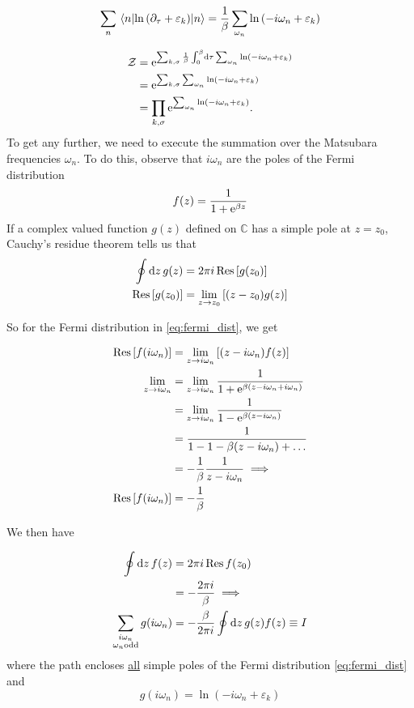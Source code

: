 \begin{equation}
\sum_n\ev{\ln\left(\partial_\tau + \varepsilon_k\right)}{n} = \frac{1}{\beta}\sum_{\omega_n}\ln\left(-i\omega_n + \varepsilon_k\right)
\end{equation}

\begin{align}
\mathcal{Z} &= \mathrm{e}^{\sum_{k,\sigma}\frac{1}{\beta}\int_0^\beta\dd{\tau}\sum_{\omega_n}\ln\left(-i\omega_n + \varepsilon_k\right)} \\
&= \mathrm{e}^{\sum_{k,\sigma}\sum_{\omega_n}\ln\left(-i\omega_n + \varepsilon_k\right)} \\
&= \prod_{k,\sigma}\mathrm{e}^{\sum_{\omega_n}\ln\left(-i\omega_n + \varepsilon_k\right)}.
\end{align}
To get any further, we need to execute the summation over the Matsubara frequencies $\omega_n$. To do this, observe that $i\omega_n$ are the poles of the Fermi distribution
\begin{equation}
\label{eq:fermi_dist}
f(z) = \frac{1}{1+\mathrm{e}^{\beta z}}
\end{equation}
If a complex valued function $g(z)$ defined on $\mathbb{C}$ has a simple pole at $z = z_0$, Cauchy's residue theorem tells us that 
\begin{align}
\oint\dd{z}g(z) &= 2\pi i\Res\left[g(z_0)\right] \\
\Res\left[g(z_0)\right]&= \lim_{z\rightarrow z_0}\left[(z-z_0)g(z)\right]
\end{align}

So for the Fermi distribution in \eqref{eq:fermi_dist}, we get

\begin{align}
\Res\left[f(i\omega_n)\right] &= \lim_{z\rightarrow i\omega_n}\left[(z-i\omega_n)f(z)\right] \nonumber \\
\lim_{z\rightarrow i\omega_n} &= \lim_{z\rightarrow i\omega_n}\frac{1}{1+\e^{\beta(z-i\omega_n + i\omega_n)}} \nonumber \\
&= \lim_{z\rightarrow i\omega_n} \frac{1}{1-\e^{\beta(z-i\omega_n)}} \nonumber \\
&= \frac{1}{1-1-\beta(z-i\omega_n)+\dots} \nonumber \\
&= -\frac{1}{\beta}\frac{1}{z-i\omega_n} \implies \nonumber \\
\Res\left[f(i\omega_n)\right] &= -\frac{1}{\beta}
\end{align}

We then have

\begin{align}
\oint \dd{z}f(z) &= 2\pi i \Res f(z_0) \\ 
&= -\frac{2\pi i}{\beta} \implies \\
\sum_{\substack{i\omega_n \\ \omega_n \text{odd}}} g(i\omega_n) &= -\frac{\beta}{2\pi i}\oint \dd{z}g(z)f(z)\equiv I
\end{align}
where the path encloses \underline{all} simple poles of the Fermi distribution \eqref{eq:fermi_dist} and 
\begin{equation}
g(i\omega_n)=\ln(-i\omega_n + \varepsilon_k)
\end{equation}


